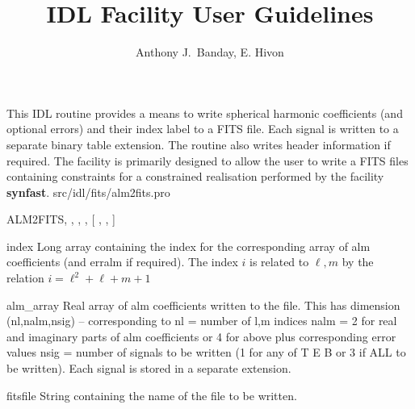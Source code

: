 



\sloppy



\title{\healpix IDL Facility User Guidelines}
 \section[alm2fits]{ }
\label{idl:alm2fits}
\author{Anthony J.~Banday, E. Hivon}




\begin{facility}
{This IDL routine provides a means to write 
spherical harmonic coefficients (and optional errors) and their index label
to a FITS file. Each signal is written to a separate binary table
extension. The routine also writes header information if required.
The facility is primarily designed to allow the user to write 
a FITS files containing constraints for a constrained realisation
performed by the \healpix facility \textbf{synfast}.
}{src/idl/fits/alm2fits.pro}
\end{facility}

\begin{IDLformat}
{ALM2FITS, 
, 
, 
, [%
, 
, 
]}
\end{IDLformat}

\begin{qualifiers}
  \begin{qulist}{} %
    \item[index] Long array containing the index for the corresponding
                 array of alm coefficients (and erralm if required). The
                 index {$i$} is related to {$\ell,m$} by the relation \hfill\newline
                 $i =\ell^2 + \ell + m + 1$
    \item[alm\_array] Real array of alm coefficients written to the
      file. This has dimension (nl,nalm,nsig) -- corresponding to\hfill\newline
      nl   = number of {l,m} indices \hfill\newline
      nalm = 2 for real and imaginary parts of alm coefficients or
             4 for above plus corresponding error values \hfill\newline
      nsig = number of signals to be written (1 for any of T E B
             or 3 if ALL to be written). Each signal is stored
             in a separate extension.
    \item[fitsfile] String containing the name of the file to be
      written.
  \end{qulist}
\end{qualifiers}

